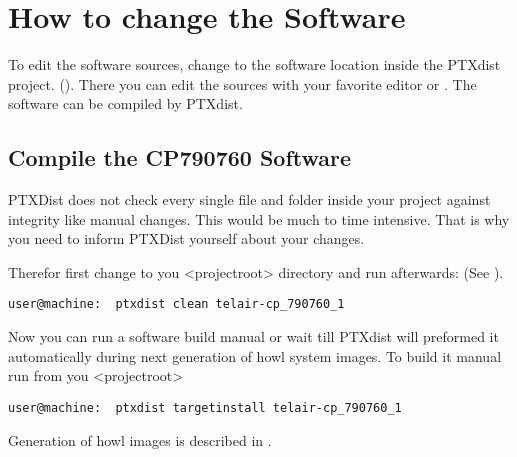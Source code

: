 \section{How to change the Software}%
\label{sec:software_change}
To edit the software sources, change to the software location inside the PTXdist
project. (). There you can edit the
sources with your favorite editor or . The software can be
compiled by PTXdist.

\subsection{Compile the CP790760 Software}%
\label{sub:compile_CP790760}

PTXDist does not check every single file and folder inside your project against
integrity like manual changes. This would be much to time intensive. That is
why you need to inform PTXDist yourself about your changes.

Therefor first change to you <projectroot> directory and run afterwards:
(See ).


\bigbreak%
\begin{lstlisting}[caption=Mark the CP790760 software as changed]
user@machine:  ptxdist clean telair-cp_790760_1
\end{lstlisting}

Now you can run a software build manual or wait till PTXdist will preformed it
automatically during next generation of howl system images. To build it manual
run from you <projectroot>

\bigbreak%
\begin{lstlisting}[caption=Build the Telair CP790760 software manual]
user@machine:  ptxdist targetinstall telair-cp_790760_1
\end{lstlisting}


Generation of howl images is described in .


